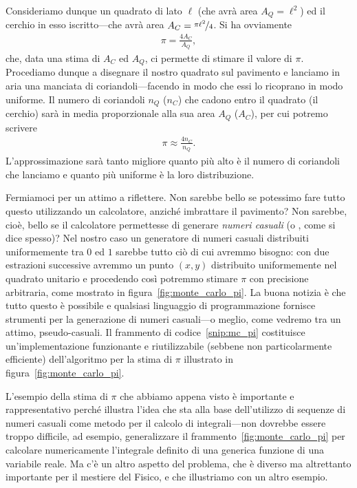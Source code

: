 Consideriamo dunque un quadrato di lato $\ell$ (che avrà area $A_Q = \ell^2$)
ed il cerchio in esso iscritto---che avrà area
$A_C = \nicefrac{\pi\ell^2}{4}$. Si ha ovviamente
\begin{align*}
  \pi = \frac{4A_C}{A_Q},
\end{align*}
che, data una stima di $A_C$ ed $A_Q$, ci permette di stimare il valore di
$\pi$. Procediamo dunque a disegnare il nostro quadrato sul pavimento e
lanciamo in aria una manciata di coriandoli---facendo in modo che essi lo
ricoprano in modo uniforme. Il numero di coriandoli $n_Q$ ($n_C$) che cadono
entro il quadrato (il cerchio) sarà in media proporzionale alla sua area
$A_Q$ ($A_C$), per cui potremo scrivere
\begin{align*}
  \pi \approx \frac{4n_C}{n_Q}.
\end{align*}
L'approssimazione sarà tanto migliore quanto più alto è il numero di
coriandoli che lanciamo e quanto più uniforme è la loro distribuzione.

Fermiamoci per un attimo a riflettere. Non sarebbe bello se potessimo fare tutto
questo utilizzando un calcolatore, anziché imbrattare il pavimento? Non
sarebbe, cioè, bello se il calcolatore permettesse di generare
\emph{numeri casuali} (o , come si dice spesso)?
Nel nostro caso un generatore di numeri casuali distribuiti uniformemente tra
$0$ ed $1$ sarebbe tutto ciò di cui avremmo bisogno: con due estrazioni
successive avremmo un punto $(x, y)$ distribuito uniformemente nel quadrato
unitario e procedendo così potremmo stimare $\pi$ con precisione arbitraria,
come mostrato in figura~\ref{fig:monte_carlo_pi}. La buona notizia è che
tutto questo è possibile e qualsiasi linguaggio di programmazione fornisce
strumenti per la generazione di numeri casuali---o meglio, come vedremo tra un
attimo, pseudo-casuali. Il frammento di codice~\ref{snip:mc_pi} costituisce
un'implementazione funzionante e riutilizzabile (sebbene non particolarmente
efficiente) dell'algoritmo per la stima di $\pi$ illustrato in
figura~\ref{fig:monte_carlo_pi}.


L'esempio della stima di $\pi$ che abbiamo appena visto è importante e
rappresentativo perché illustra l'idea che sta alla base dell'utilizzo di
sequenze di numeri casuali come metodo per il calcolo di integrali---non
dovrebbe essere troppo difficile, ad esempio, generalizzare il
frammento~\ref{fig:monte_carlo_pi} per calcolare numericamente l'integrale
definito di una generica funzione di una variabile reale. Ma c'è un altro
aspetto del problema, che è diverso ma altrettanto importante per il
mestiere del Fisico, e che illustriamo con un altro esempio.

